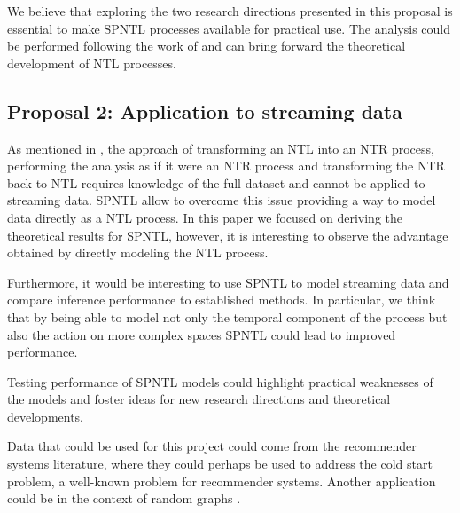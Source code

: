 We believe that exploring the two research directions presented in this proposal is essential to make SPNTL processes available for practical use. The analysis could be performed following the work of \cite{james2006poisson} and can bring forward the theoretical development of NTL processes.

\subsection{Proposal 2: Application to streaming data} %
As mentioned in , the approach of transforming an NTL into an NTR process, performing the analysis as if it were an NTR process and transforming the NTR back to NTL requires knowledge of the full dataset and cannot be applied to streaming data. SPNTL allow to overcome this issue providing a way to model data directly as a NTL process. In this paper we focused on deriving the theoretical results for SPNTL, however, it is interesting to observe the advantage obtained by directly modeling the NTL process. 

Furthermore, it would be interesting to use SPNTL to model streaming data and compare inference performance to established methods. In particular, we think that by being able to model not only the temporal component of the process but also the action on more complex spaces SPNTL could lead to improved performance.

Testing performance of SPNTL models could highlight practical weaknesses of the models and foster ideas for new research directions and theoretical developments.

Data that could be used for this project could come from the recommender systems literature, where they could perhaps be used to address the cold start problem, a well-known problem for recommender systems. Another application could be in the context of random graphs \cite{bloem2017preferential,bloem2018sampling}. 
